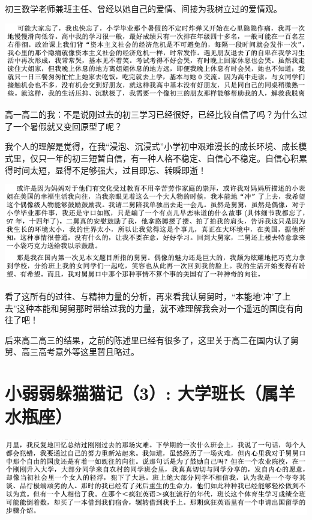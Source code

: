 \documentclass[9pt, b5paper]{article}
\begin{document}
初三数学老师兼班主任、曾经以她自己的爱情、间接为我树立过的爱情观。

\begin{center}
\includegraphics[width=.9\linewidth]{./pic/backups_plans_20210422_171522.png}
\end{center}

高一高二的我：不是说刚过去的初三学习已经很好，已经比较自信了吗？为什么过了一个暑假就又变回原型了呢？

我个人的理解是觉得，在我“浸泡、沉浸式”小学初中艰难漫长的成长环境、成长模式里，仅只一年的初三短暂自信，有一种人格不稳定、自信心不稳定。自信心积累得时间太短，显得不足够强大，过目即忘、转瞬即逝！

\begin{center}
\includegraphics[width=.9\linewidth]{./pic/readme_20210422_172512.png}
\end{center}

看了这所有的过往、与精神力量的分析，再来看我认舅舅时，“本能地‘冲’了上去”这种本能和舅舅那时带给过我的力量，就不难理解我会对一个遥远的国度有向往了吧！

后来高二高三的结果，之前的陈述里已经有很多了，这里关于高二在国内认了舅舅、高三高考意外等这里暂且略过。

\section{小弱弱躲猫猫记（3）: 大学班长（属羊水瓶座）}
\label{sec:orgdeef684}

\begin{center}
\includegraphics[width=.9\linewidth]{./pic/backups_plans_20210422_095651.png}
\end{center}
\end{document}
